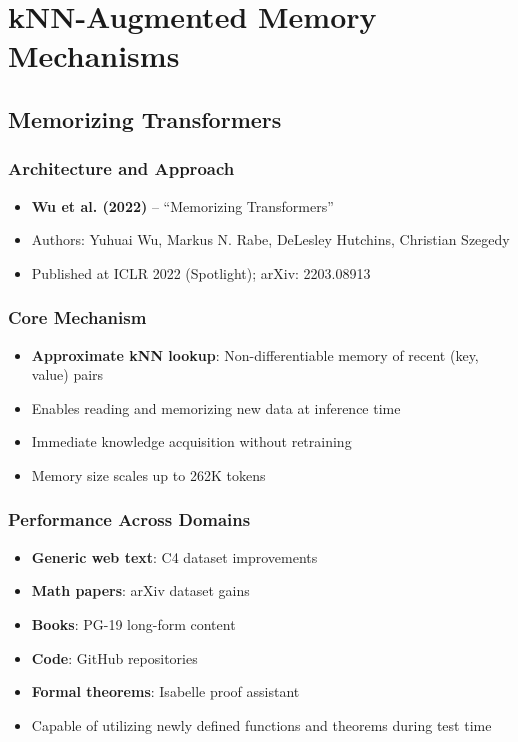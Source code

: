 \documentclass[11pt,letterpaper]{article}
\begin{document}
\section{kNN-Augmented Memory Mechanisms}

\subsection{Memorizing Transformers}

\subsubsection{Architecture and Approach}
\begin{itemize}[leftmargin=*]
    \item \textbf{Wu et al. (2022)} -- ``Memorizing Transformers'' \cite{wu2022memorizing}
    \item Authors: Yuhuai Wu, Markus N. Rabe, DeLesley Hutchins, Christian Szegedy
    \item Published at ICLR 2022 (Spotlight); arXiv: 2203.08913
\end{itemize}

\subsubsection{Core Mechanism}
\begin{itemize}[leftmargin=*]
    \item \textbf{Approximate kNN lookup}: Non-differentiable memory of recent (key, value) pairs
    \item Enables reading and memorizing new data at inference time
    \item Immediate knowledge acquisition without retraining
    \item Memory size scales up to 262K tokens
\end{itemize}

\subsubsection{Performance Across Domains}
\begin{itemize}[leftmargin=*]
    \item \textbf{Generic web text}: C4 dataset improvements
    \item \textbf{Math papers}: arXiv dataset gains
    \item \textbf{Books}: PG-19 long-form content
    \item \textbf{Code}: GitHub repositories
    \item \textbf{Formal theorems}: Isabelle proof assistant
    \item Capable of utilizing newly defined functions and theorems during test time
\end{itemize}
\end{document}

